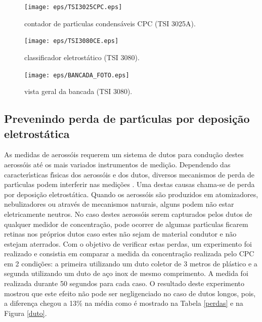 \begin{figure}[hbt]
\begin{center}
\texttt{[image: eps/TSI3025CPC.eps]}\\
\end{center}
\caption{\label{TSI3025CPC}\hspace{-0.1em} contador de part\'{\i}culas condens\'{a}veis  CPC (TSI 3025A).}
\end{figure}

\begin{figure}[hbt]
\begin{center}
\texttt{[image: eps/TSI3080CE.eps]}\\
\end{center}
\caption{\label{TSI3080CE}\hspace{-0.1em} classificador eletrost\'{a}tico (TSI 3080).}
\end{figure}


\begin{figure}[hbt]
\begin{center}
\texttt{[image: eps/BANCADA\_FOTO.eps]}\\
\end{center}
\caption{\label{BANCADA_FOTO}\hspace{-0.1em} vista geral da bancada (TSI 3080).}
\end{figure}


\subsection{Prevenindo perda de part\'{\i}culas por deposi\c{c}\~{a}o eletrost\'{a}tica}
As medidas de aeross\'{o}is requerem um sistema de dutos para condu\c{c}\~{a}o destes aeross\'{o}is at\'{e} os mais variados instrumentos de medi\c{c}\~{a}o. Dependendo das caracter\'{\i}sticas f\'{\i}sicas dos aeross\'{o}is e dos dutos, diversos mecanismos de perda de part\'{\i}culas podem interferir nas medi\c{c}\~{o}es \cite{SL}. Uma destas causas chama-se de perda por deposi\c{c}\~{a}o eletrost\'{a}tica. Quando os aeross\'{o}is s\~{a}o produzidos em atomizadores, nebulizadores ou atrav\'{e}s de mecanismos naturais, alguns podem n\~{a}o estar eletricamente neutros. No caso destes aeross\'{o}is serem capturados pelos dutos de qualquer medidor de concentra\c{c}\~{a}o, pode ocorrer de algumas part\'{\i}culas ficarem retinas nos pr\'{o}prios dutos caso estes n\~{a}o sejam de material condutor e n\~{a}o estejam aterrados. Com o objetivo de verificar estas perdas, um experimento foi realizado e consistia em comparar a medida da concentra\c{c}\~{a}o realizada pelo CPC em 2 condi\c{c}\~{o}es: a primeira utilizando um duto coletor de 3 metros de pl\'{a}stico e a segunda utilizando um duto de a\c{c}o inox de mesmo comprimento. A medida foi realizada durante 50 segundos para cada caso. O resultado deste experimento mostrou que este efeito n\~{a}o pode ser negligenciado no caso de dutos longos, pois, a diferen\c{c}a chegou a 13\% na m\'{e}dia como \'{e} mostrado na Tabela \ref{perdas} e na Figura \ref{duto}.



